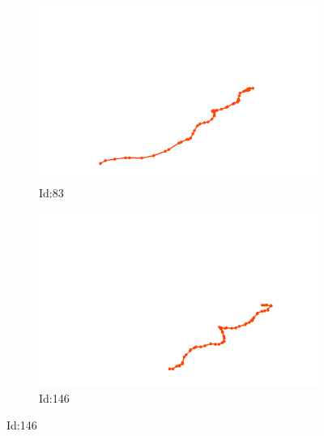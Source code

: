 \documentclass[12pt,twoside]{report}
\begin{document}
\begin{figure}
\centering
\begin{subfigure}[b]{0.20\textwidth}
\centering
\includegraphics[width=\textwidth]{../../trajectories/83.png}
\caption{Id:83}
\end{subfigure}
\begin{subfigure}[b]{0.20\textwidth}
\centering
\includegraphics[width=\textwidth]{../../trajectories/146.png}
\caption{Id:146}
\end{subfigure}
\end{figure}
\end{document}
